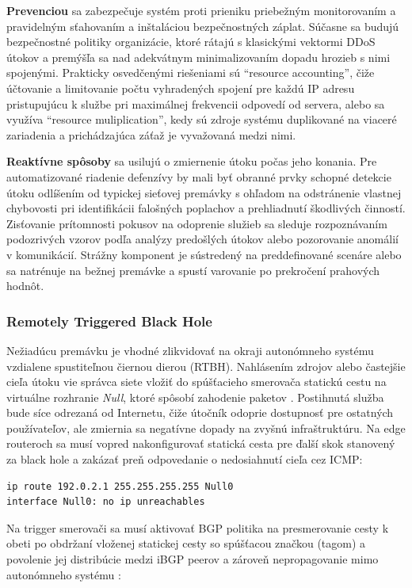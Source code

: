 \documentclass[12pt, a4paper]{article}
\begin{document}
\textbf{Prevenciou} sa zabezpečuje systém proti prieniku priebežným monitorovaním
a pravidelným sťahovaním a inštaláciou bezpečnostných záplat. Súčasne sa budujú
bezpečnostné politiky organizácie, ktoré rátajú s klasickými vektormi DDoS útokov a premýšľa sa 
nad adekvátnym minimalizovaním dopadu hrozieb s nimi spojenými. Prakticky osvedčenými 
riešeniami sú \enquote{resource accounting}, čiže účtovanie a limitovanie počtu vyhradených spojení 
pre každú IP adresu pristupujúcu k službe pri maximálnej frekvencii odpovedí od servera, alebo sa využíva 
\enquote{resource muliplication}, kedy sú zdroje systému duplikované na viaceré zariadenia a prichádzajúca 
záťaž je vyvažovaná medzi nimi.

\textbf{Reaktívne spôsoby} sa usilujú o zmiernenie útoku počas jeho konania. Pre automatizované
riadenie defenzívy by mali byť obranné prvky schopné detekcie útoku odlíšením od typickej sieťovej 
premávky s ohľadom na odstránenie vlastnej chybovosti pri identifikácii falošných poplachov
a prehliadnutí škodlivých činností. Zisťovanie prítomnosti pokusov na odoprenie služieb
sa sleduje rozpoznávaním podozrivých vzorov podľa analýzy predošlých útokov alebo
pozorovanie anomálií v komunikácií. Strážny komponent je sústredený na preddefinované scenáre alebo
sa natrénuje na bežnej premávke a spustí varovanie po prekročení prahových hodnôt.

\subsubsection{Remotely Triggered Black Hole} 
Nežiadúcu premávku je vhodné zlikvidovať na okraji autonómneho systému vzdialene spustiteľnou čiernou dierou 
(RTBH). Nahlásením zdrojov alebo  častejšie cieľa útoku vie správca siete vložiť do spúšťacieho smerovača 
statickú cestu na virtuálne rozhranie \emph{Null}, ktoré spôsobí zahodenie paketov \cite{RFC5635}. 
Postihnutá služba bude síce odrezaná od Internetu, čiže útočník odoprie dostupnosť pre ostatných 
používateľov, ale zmiernia sa negatívne dopady na zvyšnú infraštruktúru. Na edge routeroch sa musí vopred 
nakonfigurovať statická cesta pre ďalší skok stanovený za black hole a zakázať preň odpovedanie o 
nedosiahnutí cieľa cez ICMP:
\begin{lstlisting}
ip route 192.0.2.1 255.255.255.255 Null0
interface Null0: no ip unreachables
\end{lstlisting}
Na trigger smerovači sa musí aktivovať BGP politika na presmerovanie cesty k obeti 
po obdržaní vloženej statickej cesty so spúšťacou značkou (tagom) a povolenie jej distribúcie
medzi iBGP peerov a zároveň nepropagovanie mimo autonómneho systému \cite{cisco-rtbh}:
\end{document}
